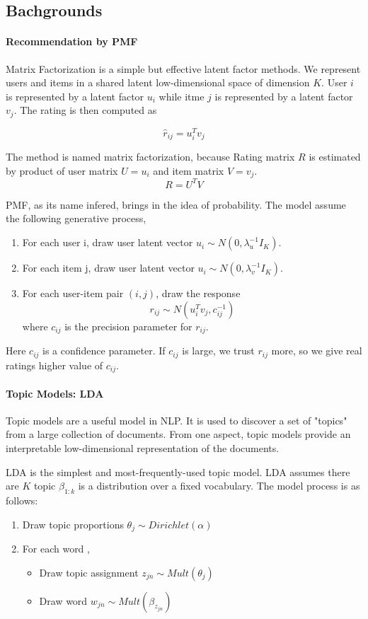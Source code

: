 \documentclass[11pt,a4paper]{article}
\begin{document}
\subsection{Bachgrounds}
\paragraph{Recommendation by PMF}
Matrix Factorization is a simple but effective latent factor methods. We represent users and items in a shared
latent low-dimensional space of dimension $K$. User $i$ is represented by a latent factor $u_i$ while itme $j$ is represented by a latent factor $v_j$. The rating is then computed as

\[\hat{r}_{ij} = u_i^T v_j\]

The method is named matrix factorization, because Rating matrix $R$ is estimated by product of user matrix $U = {u_i}$ and item matrix $V = {v_j}$.
\[R=U^T V\]

PMF, as its name infered, brings in the idea of probability. The model assume the following generative process,

\begin{enumerate}
  \item For each user i, draw user latent vector $u_i \sim N(0,\lambda_u^{-1}I_K)$.
  \item For each item j, draw user latent vector $u_i \sim N(0,\lambda_v^{-1}I_K)$.
  \item For each user-item pair $(i,j)$, draw the response
  \[ r_{ij} \sim N(u_i^T v_j, c_{ij}^{-1})\]
  where $c_{ij}$ is the precision parameter for $r_{ij}$.
\end{enumerate}

Here $c_{ij}$ is a confidence parameter. If $c_{ij}$ is large, we trust $r_{ij}$ more, so we give real ratings higher value of $c_{ij}$.

\paragraph{Topic Models: LDA}
Topic models are a useful model in NLP. It is used to discover a set of "topics" from a large collection of documents. From one aspect, topic models provide an interpretable low-dimensional representation of the documents.

LDA is the simplest and most-frequently-used topic model. LDA assumes there are $K$ topic $\beta_{1:k}$ is a distribution over a fixed vocabulary. The model process is as follows:

\begin{enumerate}
  \item Draw topic proportions $\theta_j \sim Dirichlet(\alpha)$
  \item For each word ,
    \begin{itemize}
      \item Draw topic assignment $z_{jn}\sim Mult(\theta_j)$
      \item Draw word $w_{jn} \sim Mult(\beta_{z_{jn}})$
    \end{itemize}
\end{enumerate}
\end{document}
